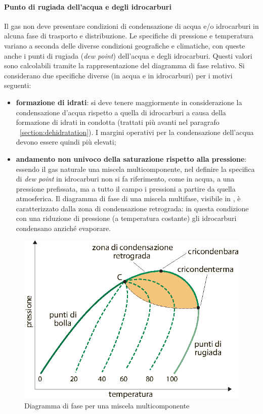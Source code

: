 \paragraph{Punto di rugiada dell'acqua e degli idrocarburi}
Il gas non deve presentare condizioni di condensazione di acqua e/o idrocarburi in alcuna fase di trasporto e distribuzione. Le specifiche di pressione e temperatura variano a seconda delle diverse condizioni geografiche e climatiche, con queste anche i punti di rugiada (\textit{dew point}) dell'acqua e degli idrocarburi. Questi valori sono calcolabili tramite la rappresentazione del diagramma di fase relativo. Si considerano due specifiche diverse (in acqua e in idrocarburi) per i motivi seguenti:
\begin{itemize}
    \item \textbf{formazione di idrati}: si deve tenere maggiormente in considerazione la condensazione d'acqua rispetto a quella di idrocarburi a causa della formazione di idrati in condotta (trattati più avanti nel paragrafo ~\ref{section:dehidratation}). I margini operativi per la condensazione dell'acqua devono essere quindi più elevati;
    \item \textbf{andamento non univoco della saturazione rispetto alla pressione}: essendo il gas naturale una miscela multicomponente, nel definire la specifica di \textit{dew point} in idrocarburi non si fa riferimento, come in acqua, a una pressione prefissata, ma a tutto il campo i pressioni a partire da quella atmosferica. Il diagramma di fase di una miscela multifase, visibile in , è caratterizzato dalla zona di condensazione retrograda: in questa condizione con una riduzione di pressione (a temperatura costante) gli idrocarburi condensano anziché evaporare.
\end{itemize}

\begin{figure}[htbp]
    \centering
    \includegraphics[width=.6\textwidth]{fig/impianti/phasediagram.eps}
    \caption{Diagramma di fase per una miscela multicomponente \parencite{bianco2005impiantigas}}
    \label{fig:phasediagram}
\end{figure}

